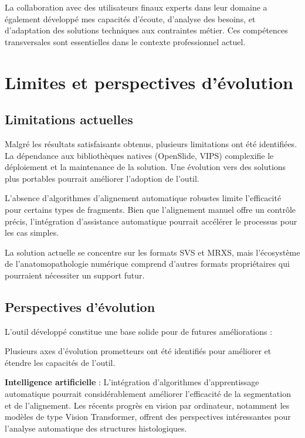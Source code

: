 \documentclass[12pt,a4paper]{report}
\begin{document}
\begin{}
\begin{}
\begin{}
La collaboration avec des utilisateurs finaux experts dans leur domaine a également développé mes capacités d'écoute, d'analyse des besoins, et d'adaptation des solutions techniques aux contraintes métier. Ces compétences transversales sont essentielles dans le contexte professionnel actuel.

\section{Limites et perspectives d'évolution}

\subsection{Limitations actuelles}

Malgré les résultats satisfaisants obtenus, plusieurs limitations ont été identifiées. La dépendance aux bibliothèques natives (OpenSlide, VIPS) complexifie le déploiement et la maintenance de la solution. Une évolution vers des solutions plus portables pourrait améliorer l'adoption de l'outil.

L'absence d'algorithmes d'alignement automatique robustes limite l'efficacité pour certains types de fragments. Bien que l'alignement manuel offre un contrôle précis, l'intégration d'assistance automatique pourrait accélérer le processus pour les cas simples.

La solution actuelle se concentre sur les formats SVS et MRXS, mais l'écosystème de l'anatomopathologie numérique comprend d'autres formats propriétaires qui pourraient nécessiter un support futur.

\subsection{Perspectives d'évolution}

\begin{center}
L'outil développé constitue une base solide pour de futures améliorations :
\end{center}

\vspace{0.5em}

Plusieurs axes d'évolution prometteurs ont été identifiés pour améliorer et étendre les capacités de l'outil.

\textbf{Intelligence artificielle} : L'intégration d'algorithmes d'apprentissage automatique pourrait considérablement améliorer l'efficacité de la segmentation et de l'alignement. Les récents progrès en vision par ordinateur, notamment les modèles de type Vision Transformer, offrent des perspectives intéressantes pour l'analyse automatique des structures histologiques.


\end{}
\end{}
\end{}
\end{document}
